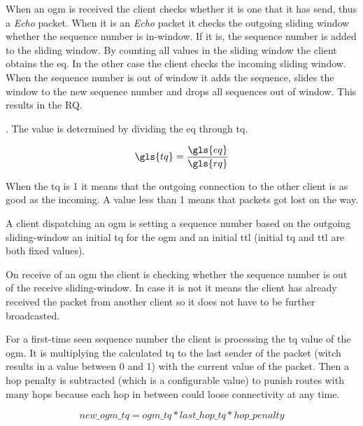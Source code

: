 When an \gls{ogm} is received the client checks whether it is one that it has send, thus a \textit{Echo} packet. When it is an \textit{Echo} packet it checks the outgoing sliding window whether the sequence number is in-window. If it is, the sequence number is added to the sliding window. By counting all values in the sliding window the client obtains the \gls{eq}. 
In the other case the client checks the incoming sliding window. When the sequence number is out of window it adds the sequence, slides the window to the new sequence number and drops all sequences out of window. This results in the \gls{RQ}.

\citet[\S2.3.3]{tobias_hardes}. The value is determined by dividing the \gls{eq} through \gls{tq}.

\begin{equation}
\label{eq:transmit_quality}
\gls{tq} = \frac{\gls{eq}}{\gls{rq}}
\end{equation}

When the \gls{tq} is 1 it means that the outgoing connection to the other client is as good as the incoming. A value less than 1 means that packets got lost on the way.

A client dispatching an \gls{ogm} is setting a sequence number based on the outgoing sliding-window an initial \gls{tq} for the \gls{ogm} and an initial \gls{ttl} (initial \gls{tq} and \gls{ttl} are both fixed values). 

On receive of an \gls{ogm} the client is checking whether the sequence number is out of the receive sliding-window. In case it is not it means the client has already received the packet from another client so it does not have to be further broadcasted.

For a first-time seen sequence number the client is processing the \gls{tq} value of the \gls{ogm}. It is multiplying the calculated \gls{tq} to the last sender of the packet (witch results in a value between 0 and 1) with the current value of the packet. Then a hop penalty is subtracted (which is a configurable value) to punish routes with many hops because each hop in between could loose connectivity at any time.

\begin{equation}
\label{eq:transmit_quality}
new\_ogm\_tq = ogm\_tq * last\_hop\_tq * hop\_penalty
\end{equation}

